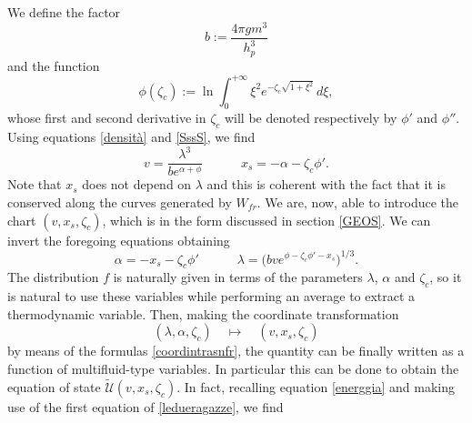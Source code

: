 \documentclass[useAMS,usenatbib,prd,twocolumn,nofootinbib]{revtex4-1}
\newcommand{\spc}{\quad \quad \quad}
\begin{document}
We define the factor
\begin{equation}
b := \dfrac{4\pi g m^3}{h_p^3}
\end{equation}
and the function
\begin{equation}
\phi(\zeta_c) :=\ln \int_0^{+\infty} \xi^2 e^{-\zeta_c \sqrt{1+\xi^2}}  \, d\xi,
\end{equation}
whose first and second derivative in $\zeta_c$ will be denoted respectively by $\phi'$ and $\phi''$.
Using equations \eqref{densità} and \eqref{SssS}, we find
\begin{equation}\label{ledueragazze}
v = \dfrac{\lambda^3}{b  e^{\alpha+\phi}}  \spc  x_s = -\alpha - \zeta_c \phi'.
\end{equation}
Note that $x_s$ does not depend on $\lambda$ and this is coherent with the fact that it is conserved along the curves generated by $W_{fr}$. We are, now, able to introduce the chart $(v,x_s,\zeta_c)$, which is in the form discussed in section \ref{GEOS}. We can invert the foregoing equations obtaining
\begin{equation}\label{coordintrasnfr}
\alpha = -x_s - \zeta_c \phi'  \spc  \lambda = \big( bv e^{\phi-\zeta_c \phi'-x_s} \big)^{1/3}.
\end{equation}  
The distribution $f$ is naturally given in terms of the parameters $\lambda$, $\alpha$ and $\zeta_c$, so it is natural to use these variables while performing an average to extract a thermodynamic variable. Then, making the coordinate transformation
\begin{equation}
(\lambda,\alpha,\zeta_c)  \quad \longmapsto \quad (v,x_s,\zeta_c)
\end{equation}
by means of the formulas \eqref{coordintrasnfr}, the quantity can be finally written as a function of multifluid-type variables. In particular this can be done to obtain the equation of state $\tilde{\mathcal{U}}(v,x_s,\zeta_c)$. In fact, recalling equation \eqref{energgia} and making use of the first equation of \eqref{ledueragazze}, we find 
\end{document}
